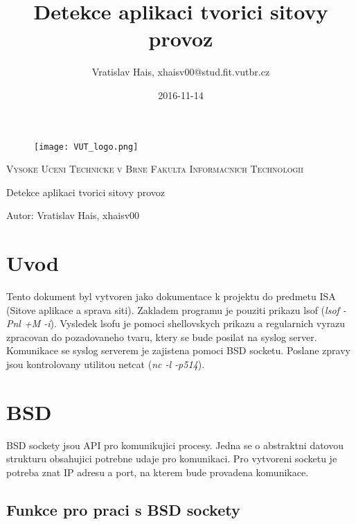 \documentclass[a4paper]{article}
\title{Detekce aplikaci tvorici sitovy provoz}
\date{2016-11-14}
\author{Vratislav Hais, xhaisv00@stud.fit.vutbr.cz}
\begin{document}

	\begin{center}
		\begin{figure}[t!]
			\centering
			\texttt{[image: VUT\_logo.png]}
			\vspace{1in}
		\end{figure}

		\begin{center}
			\large
			\textsc{Vysoke Uceni Technicke v Brne}
			\textsc{Fakulta Informacnich Technologii}
			\vspace{2in}
		\end{center}
		{
			\huge
			Detekce aplikaci tvorici sitovy provoz
		}
	\end{center}

	\vspace*{\fill}
	{
		\large
		\foreignlanguage{english}{Autor: Vratislav Hais, xhaisv00}
	}


	\newpage
	\tableofcontents
	\newpage

	\section{Uvod}

	Tento dokument byl vytvoren jako dokumentace k projektu do predmetu ISA (Sitove aplikace a sprava siti).
	Zakladem programu je pouziti prikazu lsof (\emph{lsof -Pnl +M -i}). Vysledek lsofu je pomoci shellovskych prikazu a regularnich vyrazu zpracovan do pozadovaneho tvaru, ktery se bude posilat na syslog server. Komunikace se syslog serverem je zajistena pomoci BSD socketu. Poslane zpravy jsou kontrolovany utilitou netcat (\emph{nc -l -p514}).

	\section{BSD}

	BSD sockety jsou API pro komunikujici procesy. Jedna se o abstraktni datovou strukturu obsahujici potrebne udaje pro komunikaci. Pro vytvoreni socketu je potreba znat IP adresu a port, na kterem bude provadena komunikace.

	\subsection{Funkce pro praci s BSD sockety}
\end{document}

